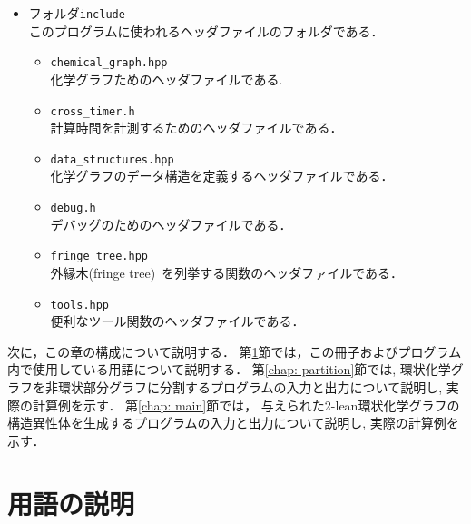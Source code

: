 \documentclass[11pt,titlepage,dvipdfmx,twoside]{jsbook}
\begin{document}
{\begin{itemize}
\begin{itemize}
\item フォルダ{\tt include}\\
	このプログラムに使われるヘッダファイルのフォルダである．
	\begin{itemize}
		\item{\tt chemical\_graph.hpp}\\
		  化学グラフためのヘッダファイルである.
		\item{\tt cross\_timer.h}\\
			計算時間を計測するためのヘッダファイルである．
			
		\item{\tt data\_structures.hpp}\\
			化学グラフのデータ構造を定義するヘッダファイルである． 
			
		\item{\tt debug.h}\\
			デバッグのためのヘッダファイルである．
			
		\item{\tt fringe\_tree.hpp}\\
			外縁木(fringe tree)~\cite{branch}を列挙する関数のヘッダファイルである．
			
		\item{\tt tools.hpp}\\
			便利なツール関数のヘッダファイルである．		
	\end{itemize}
    \end{itemize}
\end{itemize}
}

次に，この章の構成について説明する．
第\ref{chap:term}節では，この冊子およびプログラム内で使用している用語について説明する．
第\ref{chap: partition}節では, 
環状化学グラフを非環状部分グラフに分割するプログラムの入力と出力について説明し, 
実際の計算例を示す．
第\ref{chap: main}節では，
与えられた2-lean環状化学グラフの構造異性体を生成するプログラムの入力と出力について説明し, 
実際の計算例を示す．



\section{用語の説明}
\label{chap:term}
\end{document}
